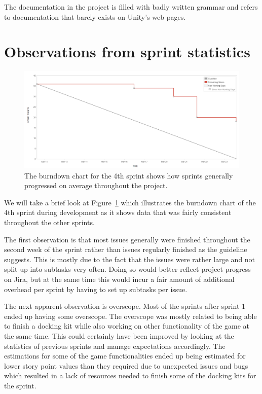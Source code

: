 The documentation in the project is filled with badly written grammar and refers to documentation that barely exists on Unity's web pages. 

\section{Observations from sprint statistics}
\begin{figure}[tbph]
    \centering
    \includegraphics[width=\textwidth]{images/DOCKLSprint4}
    \caption[Burndown chart from the 4th sprint]{The burndown chart for the 4th sprint shows how sprints generally progressed on average throughout the project.}
    \label{fig:burndownChart}
\end{figure}

We will take a brief look at Figure~\ref{fig:burndownChart} which illustrates the burndown chart of the 4th sprint during development as it shows data that was fairly consistent throughout the other sprints. 

The first observation is that most issues generally were finished throughout the second week of the sprint rather than issues regularly finished as the guideline suggests. This is mostly due to the fact that the issues were rather large and not split up into subtasks very often. Doing so would better reflect project progress on Jira, but at the same time this would incur a fair amount of additional overhead per sprint by having to set up subtasks per issue. 

The next apparent observation is overscope. Most of the sprints after sprint 1 ended up having some overscope. The overscope was mostly related to being able to finish a docking kit while also working on other functionality of the game at the same time. This could certainly have been improved by looking at the statistics of previous sprints and manage expectations accordingly. The estimations for some of the game functionalities ended up being estimated for lower story point values than they required due to unexpected issues and bugs which resulted in a lack of resources needed to finish some of the docking kits for the sprint. 

